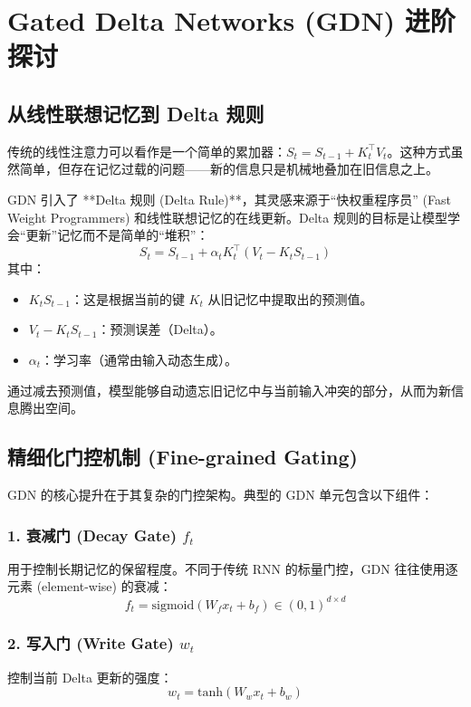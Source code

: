 \section{Gated Delta Networks (GDN) 进阶探讨}

\subsection{从线性联想记忆到 Delta 规则}
传统的线性注意力可以看作是一个简单的累加器：$S_t = S_{t-1} + K_t^\top V_t$。这种方式虽然简单，但存在记忆过载的问题——新的信息只是机械地叠加在旧信息之上。

GDN 引入了 **Delta 规则 (Delta Rule)**，其灵感来源于“快权重程序员” (Fast Weight Programmers) 和线性联想记忆的在线更新。Delta 规则的目标是让模型学会“更新”记忆而不是简单的“堆积”：
\begin{equation}
    S_t = S_{t-1} + \alpha_t K_t^\top (V_t - K_t S_{t-1})
\end{equation}
其中：
\begin{itemize}
    \item $K_t S_{t-1}$：这是根据当前的键 $K_t$ 从旧记忆中提取出的预测值。
    \item $V_t - K_t S_{t-1}$：预测误差（Delta）。
    \item $\alpha_t$：学习率（通常由输入动态生成）。
\end{itemize}
通过减去预测值，模型能够自动遗忘旧记忆中与当前输入冲突的部分，从而为新信息腾出空间。

\subsection{精细化门控机制 (Fine-grained Gating)}
GDN 的核心提升在于其复杂的门控架构。典型的 GDN 单元包含以下组件：

\subsubsection{1. 衰减门 (Decay Gate) $f_t$}
用于控制长期记忆的保留程度。不同于传统 RNN 的标量门控，GDN 往往使用逐元素 (element-wise) 的衰减：
\begin{equation}
    f_t = \text{sigmoid}(W_f x_t + b_f) \in (0, 1)^{d \times d}
\end{equation}

\subsubsection{2. 写入门 (Write Gate) $w_t$}
控制当前 Delta 更新的强度：
\begin{equation}
    w_t = \text{tanh}(W_w x_t + b_w)
\end{equation}

